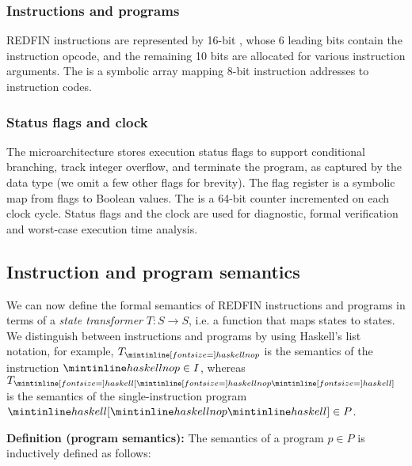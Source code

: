 \subsubsection{Instructions and programs}
REDFIN instructions are represented by 16-bit , whose 6
leading bits contain the instruction opcode, and the remaining 10 bits are
allocated for various instruction arguments. The  is a symbolic
array mapping 8-bit instruction addresses to instruction codes.


\subsubsection{Status flags and clock}
The microarchitecture stores execution status flags to support conditional
branching, track integer overflow, and terminate the program, as captured by the
data type  (we omit a few other flags for brevity). The flag register is a
symbolic map from flags to Boolean values. The  is a 64-bit counter
incremented on each clock cycle. Status flags and the clock are used for
diagnostic, formal verification and worst-case execution time analysis.


\subsection{Instruction and program semantics}

We can now define the formal semantics of REDFIN instructions and programs in terms
of a \emph{state transformer} $T : S \rightarrow S$, i.e. a function that maps
states to states. We distinguish between instructions and programs by using
Haskell's list notation, for example, $T_{\subhs{nop}}$ is the semantics of the
instruction $\hs{nop} \in I$, whereas $T_{\subhs{[}\subhs{nop}\subhs{]}}$ is the
semantics of the single-instruction program $\hs{[}\hs{nop}\hs{]} \in P$.


\textbf{Definition (program semantics):} The semantics of a program $p \in P$
is inductively defined as follows:


